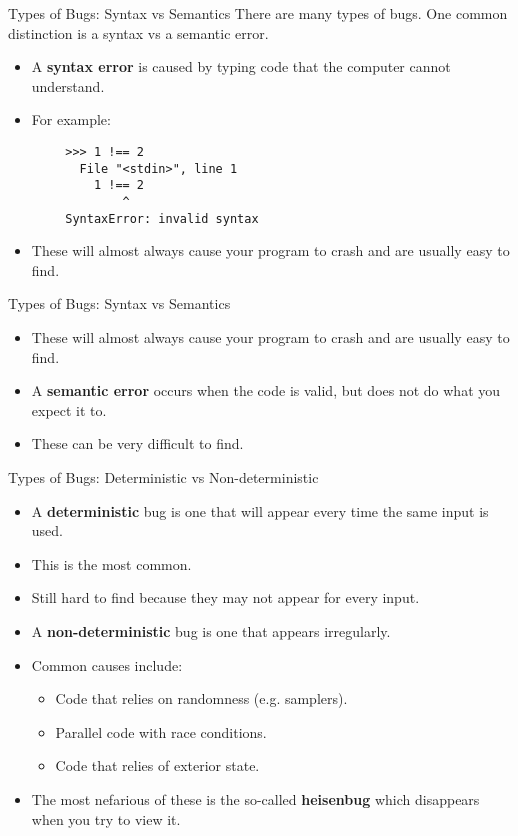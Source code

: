 \documentclass[serif,xcolor=pdftex,dvipsnames,table,hyperref={bookmarks=false,breaklinks}]{beamer}
\begin{document}

\begin{frame}[t,fragile]{Types of Bugs: Syntax vs Semantics}
	There are many types of bugs. One common distinction is a syntax vs a semantic error.
	\begin{itemize}[<+->]
		\item A \textbf{syntax error} is caused by typing code that the computer cannot understand.
		\item For example:
	\end{itemize}
	\pause
	\begin{lstlisting}
		>>> 1 !== 2
		  File "<stdin>", line 1
		    1 !== 2
		        ^
		SyntaxError: invalid syntax
	\end{lstlisting}
	\pause
	\begin{itemize}
		\item These will almost always cause your program to crash and are usually easy to find.
	\end{itemize}
\end{frame}

\begin{frame}[t]{Types of Bugs: Syntax vs Semantics}
	\begin{itemize}
		\item These will almost always cause your program to crash and are usually easy to find.
		\item A \textbf{semantic error} occurs when the code is valid, but does not do what you expect it to.
		\item These can be very difficult to find.
	\end{itemize}
\end{frame}

\begin{frame}[t]{Types of Bugs: Deterministic vs Non-deterministic}
	\begin{itemize}[<+->]
		\item A \textbf{deterministic} bug is one that will appear every time the same input is used.
		\item This is the most common.
		\item Still hard to find because they may not appear for every input.
		\item A \textbf{non-deterministic} bug is one that appears irregularly.
		\item Common causes include:
		\begin{itemize}[<+->]
			\item Code that relies on randomness (e.g. samplers).
			\item Parallel code with race conditions.
			\item Code that relies of exterior state.
		\end{itemize}
		\item The most nefarious of these is the so-called \textbf{heisenbug} which disappears when you try to view it.
	\end{itemize}
\end{frame}
\end{document}
